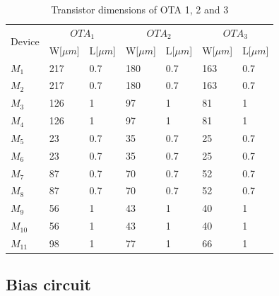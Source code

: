 \begin{table}[h]
\centering
\caption{Transistor dimensions of OTA 1, 2 and 3}
\label{final_ota}
\begin{tabular}{l||l|l||l|l||l|l}
\hline
\multirow{2}{*}{Device} & \multicolumn{2}{c||}{$OTA_1$} & \multicolumn{2}{c||}{$OTA_2$} & \multicolumn{2}{c}{$OTA_3$}\\\cline{2-7}
                        &W[$\mu m$] & L[$\mu m$]& W[$\mu m$] & L[$\mu m$] & W[$\mu m$] & L[$\mu m$]\\\hline
            $M_1$       & 217 & 0.7 & 180 & 0.7 & 163 & 0.7\\
            $M_2$        & 217 & 0.7 & 180 & 0.7 & 163 & 0.7\\
            $M_3$        & 126 & 1 & 97 & 1 & 81 & 1\\
            $M_4$        & 126 & 1 & 97 & 1 & 81 & 1\\
            $M_5$        & 23 & 0.7 & 35 & 0.7 & 25 & 0.7\\
            $M_6$        & 23 & 0.7 & 35 & 0.7 & 25 & 0.7\\
            $M_7$        & 87 & 0.7 & 70 & 0.7 & 52 & 0.7\\
            $M_8$        & 87 & 0.7 & 70 & 0.7 & 52 & 0.7\\
            $M_9$        & 56 & 1 & 43 & 1 & 40 & 1\\
            $M_{10}$        & 56 & 1 & 43 & 1 & 40 & 1\\
            $M_{11}$        & 98 & 1 & 77 & 1 & 66 & 1\\
\hline            
\end{tabular}
\end{table}

\subsection{Bias circuit}

